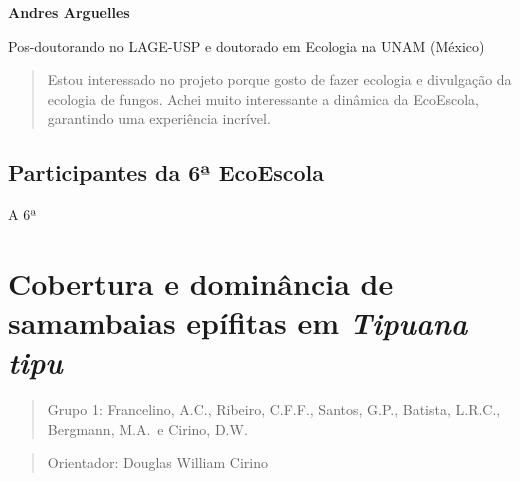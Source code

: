\documentclass[
]{book}
\begin{document}
\textbf{Andres Arguelles}

Pos-doutorando no LAGE-USP e doutorado em Ecologia na UNAM (México)

\begin{quote}
Estou interessado no projeto porque gosto de fazer ecologia e divulgação da ecologia de fungos. Achei muito interessante a dinâmica da EcoEscola, garantindo uma experiência incrível.
\end{quote}

\section{Participantes da 6ª EcoEscola}\label{participantes-da-6uxaa-ecoescola}

A 6ª

\chapter{\texorpdfstring{Cobertura e dominância de samambaias epífitas em \emph{Tipuana tipu}}{Cobertura e dominância de samambaias epífitas em Tipuana tipu}}\label{cobertura-e-dominuxe2ncia-de-samambaias-epuxedfitas-em-tipuana-tipu}

\begin{quote}
Grupo 1: Francelino, A.C., Ribeiro, C.F.F., Santos, G.P., Batista, L.R.C., Bergmann, M.A.~e Cirino, D.W.
\end{quote}

\begin{quote}
Orientador: Douglas William Cirino
\end{quote}
\end{document}

